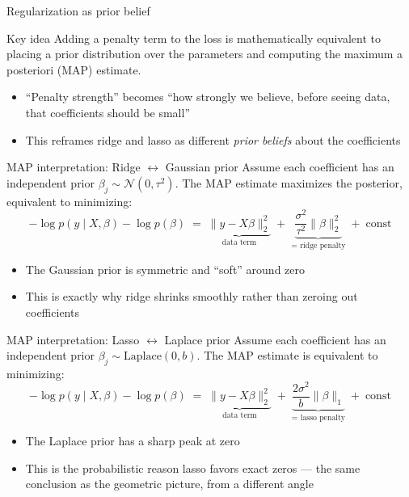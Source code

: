 \documentclass[aspectratio=169, 10pt]{beamer}
\begin{document}
\begin{frame}{Regularization as prior belief}
  \begin{block}{Key idea}
    Adding a penalty term to the loss is mathematically equivalent to placing a prior distribution over the parameters and computing the maximum a posteriori (MAP) estimate.
  \end{block}
  \begin{itemize}
    \item ``Penalty strength'' becomes ``how strongly we believe, before seeing data, that coefficients should be small''
    \item This reframes ridge and lasso as different \emph{prior beliefs} about the coefficients
  \end{itemize}
\end{frame}

\begin{frame}{MAP interpretation: Ridge $\leftrightarrow$ Gaussian prior}
  Assume each coefficient has an independent prior $\beta_j \sim \mathcal{N}(0, \tau^2)$. The MAP estimate maximizes the posterior, equivalent to minimizing:
  \[
    -\log p(y \mid X, \beta) - \log p(\beta) \;=\; \underbrace{\|y - X\beta\|_2^2}_{\text{data term}} \;+\; \underbrace{\frac{\sigma^2}{\tau^2} \|\beta\|_2^2}_{\text{= ridge penalty}} \;+\; \text{const}
  \]
  \begin{itemize}
    \item The Gaussian prior is symmetric and ``soft'' around zero
    \item This is exactly why ridge shrinks smoothly rather than zeroing out coefficients
  \end{itemize}
\end{frame}

\begin{frame}{MAP interpretation: Lasso $\leftrightarrow$ Laplace prior}
  Assume each coefficient has an independent prior $\beta_j \sim \text{Laplace}(0, b)$. The MAP estimate is equivalent to minimizing:
  \[
    -\log p(y \mid X, \beta) - \log p(\beta) \;=\; \underbrace{\|y - X\beta\|_2^2}_{\text{data term}} \;+\; \underbrace{\frac{2\sigma^2}{b} \|\beta\|_1}_{\text{= lasso penalty}} \;+\; \text{const}
  \]
  \begin{itemize}
    \item The Laplace prior has a sharp peak at zero
    \item This is the probabilistic reason lasso favors exact zeros --- the same conclusion as the geometric picture, from a different angle
  \end{itemize}
\end{frame}
\end{document}
